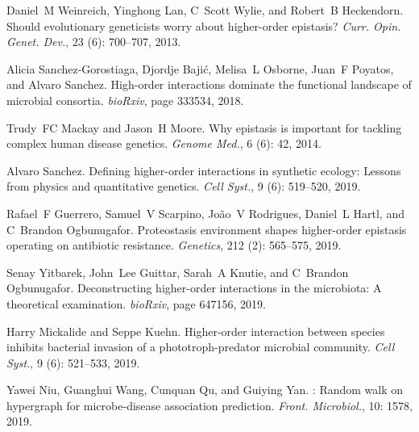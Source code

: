 Daniel~M Weinreich, Yinghong Lan, C~Scott Wylie, and Robert~B Heckendorn.
\newblock Should evolutionary geneticists worry about higher-order epistasis?
\newblock \emph{Curr. Opin. Genet. Dev.}, 23 (6): 700--707,
2013.

Alicia {Sanchez-Gorostiaga}, Djordje Baji{\'c}, Melisa~L Osborne, Juan~F
Poyatos, and Alvaro Sanchez.
\newblock High-order interactions dominate the functional landscape of
microbial consortia.
\newblock \emph{bioRxiv}, page 333534, 2018.

Trudy~FC Mackay and Jason~H Moore.
\newblock Why epistasis is important for tackling complex human disease
genetics.
\newblock \emph{Genome Med.}, 6 (6): 42, 2014.

Alvaro Sanchez.
\newblock Defining higher-order interactions in synthetic ecology: {{Lessons}}
from physics and quantitative genetics.
\newblock \emph{Cell Syst.}, 9 (6): 519--520, 2019.

Rafael~F Guerrero, Samuel~V Scarpino, Jo{\~a}o~V Rodrigues, Daniel~L Hartl, and
C~Brandon Ogbunugafor.
\newblock Proteostasis environment shapes higher-order epistasis operating on
antibiotic resistance.
\newblock \emph{Genetics}, 212 (2): 565--575, 2019.

Senay Yitbarek, John~Lee Guittar, Sarah~A Knutie, and C~Brandon Ogbunugafor.
\newblock Deconstructing higher-order interactions in the microbiota: {{A}}
theoretical examination.
\newblock \emph{bioRxiv}, page 647156, 2019.

Harry Mickalide and Seppe Kuehn.
\newblock Higher-order interaction between species inhibits bacterial invasion
of a phototroph-predator microbial community.
\newblock \emph{Cell Syst.}, 9 (6): 521--533, 2019.

Yawei Niu, Guanghui Wang, Cunquan Qu, and Guiying Yan.
: {{Random}} walk on hypergraph for microbe-disease
association prediction.
\newblock \emph{Front. Microbiol.}, 10: 1578, 2019.

